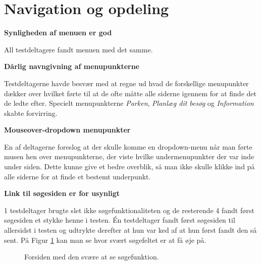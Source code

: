 \documentclass[10pt,a4paper]{article}      %
\newcommand\pic[1]{\texttt{[image: Pics/\#1]}}
\renewcommand\good{\pic{good}}
\renewcommand\goodidea{\pic{goodidea}}
\renewcommand\seriousproblem{\pic{seriousproblem}}
\begin{document}
\section{Navigation og opdeling}
\begin{kommentarer}

\item[\good]{\textbf{Synligheden af menuen er god}}

All testdeltagere fandt menuen med det samme.

\item[\seriousproblem]{\textbf{Dårlig navngivning af menupunkterne}}

Testdeltagerne havde besvær med at regne ud hvad de forskellige menupunkter
dækker over hvilket førte til at de ofte måtte alle siderne igennem for at finde
det de ledte efter. Specielt menupunkterne \emph{Parken}, \emph{Planlæg dit
besøg} og \emph{Information} skabte forvirring.

\item[\goodidea] \textbf{Mouseover-dropdown menupunkter}

En af deltagerne foreslog at der skulle komme en dropdown-menu når man førte
musen hen over menupunkterne, der viste hvilke undermenupunkter der var inde
under siden. Dette kunne give et bedre overblik, så man ikke skulle klikke ind
på alle siderne for at finde et bestemt underpunkt.

\item[\seriousproblem]{\textbf{Link til søgesiden er for usynligt}}

1 testdeltager brugte slet ikke søgefunktionaliteten og de resterende 4 fandt
først søgesiden et stykke henne i testen. Én testdeltager fandt først søgesiden
til allersidst i testen og udtrykte derefter at hun var ked af at hun først
fandt den så sent. På Figur \ref {fig:forside} kan man se hvor svært søgefeltet
er at få øje på.

\begin{figure}[htbp]
    \centering
    \caption{Forsiden med den svære at se søgefunktion.}
    \label{fig:forside}
\end{figure}


\end{kommentarer}
\end{document}
